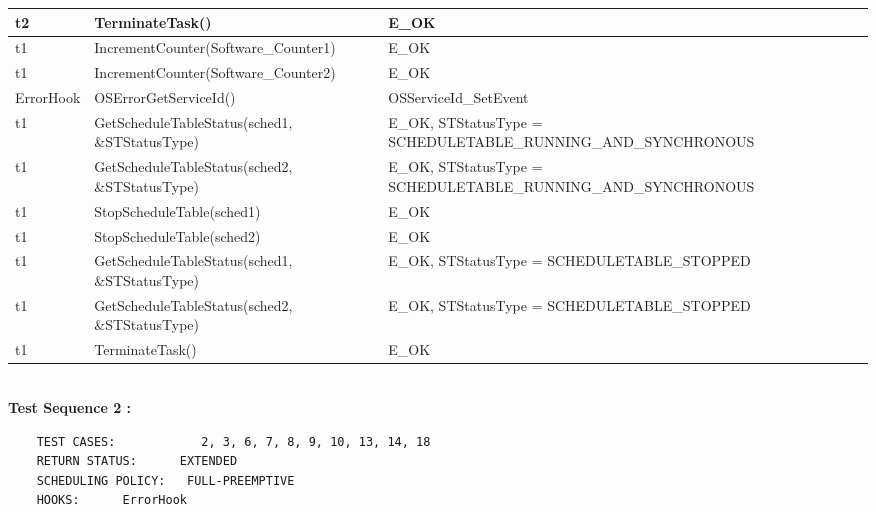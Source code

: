\documentclass[10pt]{article}
\newlength{\Li}\settowidth{\Li}{Running}
\newlength{\Lii}\setlength{\Lii}{7cm}
\newlength{\Liiii}\setlength{\Liiii}{0.9cm}
\newlength{\Liii}\setlength{\Liii}{\textwidth} \addtolength{\Liii}{-\Li} \addtolength{\Liii}{-\Lii} \addtolength{\Liii}{-\Liiii}
\begin{document}
\begin{supertabular}{|p{\Li}|p{\Lii}|p{\Liii}|p{\Liiii}|}
	t2		& TerminateTask()													& E\_OK																	& \\ \hline
	t1		& IncrementCounter(Software\_Counter1)								& E\_OK																	& \\ \hline
	t1		& IncrementCounter(Software\_Counter2)								& E\_OK																	& \\ \hline
	ErrorHook	& OSErrorGetServiceId()												& OSServiceId\_SetEvent														& \\ \hline
	t1		& GetScheduleTableStatus(sched1, \&STStatusType)						& E\_OK, STStatusType = SCHEDULETABLE\_RUNNING\_\-AND\_SYNCHRONOUS		& \\ \hline
	t1		& GetScheduleTableStatus(sched2, \&STStatusType)						& E\_OK, STStatusType = SCHEDULETABLE\_RUNNING\_\-AND\_SYNCHRONOUS		& \\ \hline
	t1		& StopScheduleTable(sched1)											& E\_OK																	& \\ \hline
	t1		& StopScheduleTable(sched2)											& E\_OK																	& \\ \hline
	t1		& GetScheduleTableStatus(sched1, \&STStatusType)						& E\_OK, STStatusType = SCHEDULETABLE\_STOPPED							& \\ \hline
	t1		& GetScheduleTableStatus(sched2, \&STStatusType)						& E\_OK, STStatusType = SCHEDULETABLE\_STOPPED							& \\ \hline
	t1		& TerminateTask()													& E\_OK																	& \\ \hline
	\end{supertabular}\\

	\textbf{Test Sequence 2 :}
	\begin{lstlisting}
	TEST CASES:		       2, 3, 6, 7, 8, 9, 10, 13, 14, 18
	RETURN STATUS:	  	EXTENDED
	SCHEDULING POLICY:   FULL-PREEMPTIVE
	HOOKS:		ErrorHook
	\end{lstlisting}
	
	
\end{document}
